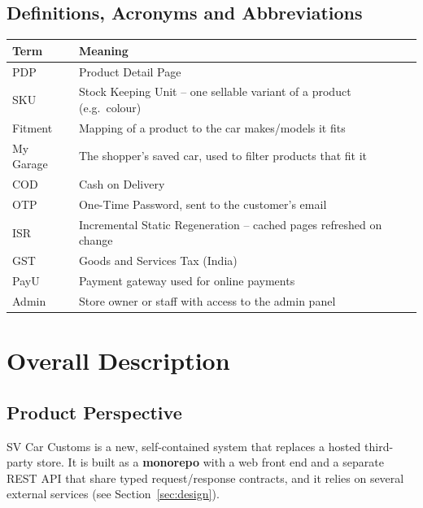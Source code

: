\documentclass[11pt,a4paper]{article}
\newcommand{\newsection}[1]{\clearpage\section{#1}}
\begin{document}
\subsection{Definitions, Acronyms and Abbreviations}
\begin{tabularx}{\linewidth}{@{}l X@{}}
\toprule
\textbf{Term} & \textbf{Meaning} \\
\midrule
PDP & Product Detail Page \\
SKU & Stock Keeping Unit -- one sellable variant of a product (e.g.\ colour) \\
Fitment & Mapping of a product to the car makes/models it fits \\
My Garage & The shopper's saved car, used to filter products that fit it \\
COD & Cash on Delivery \\
OTP & One-Time Password, sent to the customer's email \\
ISR & Incremental Static Regeneration -- cached pages refreshed on change \\
GST & Goods and Services Tax (India) \\
PayU & Payment gateway used for online payments \\
Admin & Store owner or staff with access to the admin panel \\
\bottomrule
\end{tabularx}

\newsection{Overall Description}
\subsection{Product Perspective}
SV Car Customs is a new, self-contained system that replaces a hosted third-party
store. It is built as a \textbf{monorepo} with a web front end and a separate REST API
that share typed request/response contracts, and it relies on several external
services (see Section~\ref{sec:design}).
\end{document}
